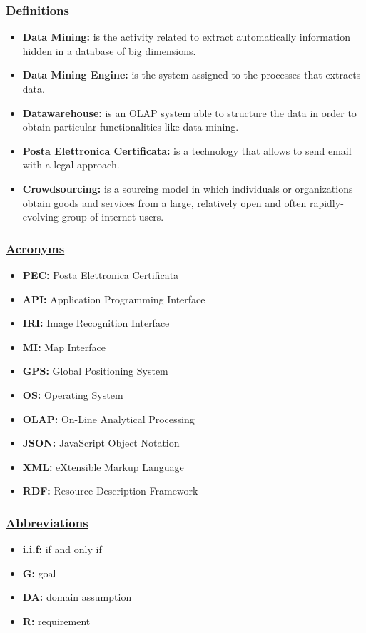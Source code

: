 	\subsubsection[Definitions]{\hyperlink{toc}{Definitions}}
		\begin{itemize}
			\item \textbf{Data Mining:} is the activity related to extract automatically information hidden in a database of big dimensions.
			\item \textbf{Data Mining Engine:} is the system assigned to the processes that extracts data. 
			\item \textbf{Datawarehouse:} is an OLAP system able to structure the data in order to obtain particular functionalities like data mining.
			\item \textbf{Posta Elettronica Certificata:} is a technology that allows to send email with a legal approach.
			\item \textbf{Crowdsourcing:} is a sourcing model in which individuals or organizations obtain goods and services from a large, relatively open and often rapidly-evolving group of internet users.
		\end{itemize}
	\subsubsection[Acronyms]{\hyperlink{toc}{Acronyms}}
		\begin{itemize}
			\item \textbf{PEC:} Posta Elettronica Certificata
			\item \textbf{API:} Application Programming Interface
			\item \textbf{IRI:} Image Recognition Interface
			\item \textbf{MI:} Map Interface
			\item \textbf{GPS:} Global Positioning System
			\item \textbf{OS:} Operating System
			\item \textbf{OLAP:} On-Line Analytical Processing
			\item \textbf{JSON:} JavaScript Object Notation
			\item \textbf{XML:} eXtensible Markup Language
			\item \textbf{RDF:} Resource Description Framework
		\end{itemize}
	\subsubsection[Abbreviations]{\hyperlink{toc}{Abbreviations}}
		\begin{itemize}
	        \item \textbf{i.i.f:} if and only if
			\item \textbf{G:} goal
			\item \textbf{DA:} domain assumption
			\item \textbf{R:} requirement
		\end{itemize}
		
